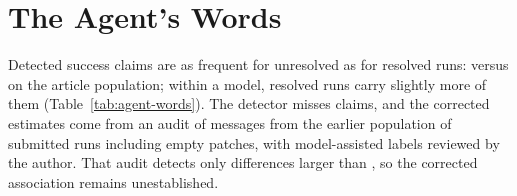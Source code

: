 \section{The Agent's Words}
\label{sec:words}


Detected success claims are as frequent for unresolved as for resolved runs:  versus  on the article population; within a model, resolved runs carry slightly more of them (Table~\ref{tab:agent-words}). The detector misses claims, and the corrected estimates come from an audit of  messages from the earlier population of  submitted runs including empty patches, with model-assisted labels reviewed by the author. That audit detects only differences larger than , so the corrected association remains unestablished.

